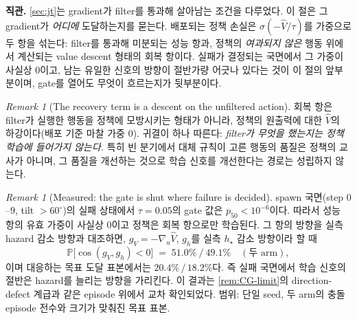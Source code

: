 \documentclass[11pt]{article}
\theoremstyle{plain}
\theoremstyle{definition}
\theoremstyle{remark}
\newtheorem{remark}[theorem]{Remark}
\newcommand{\Prob}{\mathbb{P}}
\newcommand{\Vhat}{\widehat V}
\newcommand{\grad}{\nabla}
\begin{document}
\textbf{직관.} \cref{sec:jt}는 gradient가 filter를 통과해 살아남는 조건을 다루었다. 이 절은 그
gradient가 \emph{어디에} 도달하는지를 묻는다. 배포되는 정책 손실은 $\sigma(-\Vhat/\tau)$를
가중으로 두 항을 섞는다: filter를 통과해 미분되는 성능 항과, 정책의 \emph{여과되지 않은}
행동 위에서 계산되는 value descent 형태의 회복 항이다. 실패가 결정되는 국면에서 그 가중이
사실상 $0$이고, 남는 유일한 신호의 방향이 절반가량 어긋나 있다는 것이 이 절의 앞부분이며,
gate를 열어도 무엇이 흐르는지가 뒷부분이다.

\begin{remark}[The recovery term is a descent on the unfiltered action]\label{rem:rec-identity}
회복 항은 filter가 실행한 행동을 정책에 모방시키는 형태가 아니라, 정책의 원출력에 대한
$\Vhat$의 하강이다(배포 기준 마찰 가중 $0$). 귀결이 하나 따른다: \emph{filter가 무엇을 했는지는
정책 학습에 들어가지 않는다.} 특히 빈 분기에서 대체 규칙이 고른 행동의 품질은 정책의 교사가
아니며, 그 품질을 개선하는 것으로 학습 신호를 개선한다는 경로는 성립하지 않는다.
\end{remark}

\begin{remark}[Measured: the gate is shut where failure is decided]\label{rem:gate-fail}
spawn 국면(step $0$--$9$, tilt $>60^\circ$)의 실패 상태에서 $\tau=0.05$의 gate 값은
$p_{50}<10^{-6}$이다. 따라서 성능 항의 유효 가중이 사실상 $0$이고 정책은 회복 항으로만
학습된다. 그 항의 방향을 실측 hazard 감소 방향과 대조하면, $g_V=-\grad_u\Vhat$, $g_h$를
실측 $h_\star$ 감소 방향이라 할 때
\[
  \Prob\big[\cos(g_V,g_h)<0\big]
  \;=\; 51.0\%\ /\ 49.1\% \quad(\text{두 arm}),
\]
이며 대응하는 목표 도달 표본에서는 $20.4\%\,/\,18.2\%$다. 즉 실패 국면에서 학습 신호의 절반은
hazard를 늘리는 방향을 가리킨다. 이 결과는 \cref{rem:CG-limit}의 direction-defect 계급과 같은
episode 위에서 교차 확인되었다. 범위: 단일 seed, 두 arm의 충돌 episode 전수와 크기가 맞춰진
목표 표본.
\end{remark}
\end{document}
